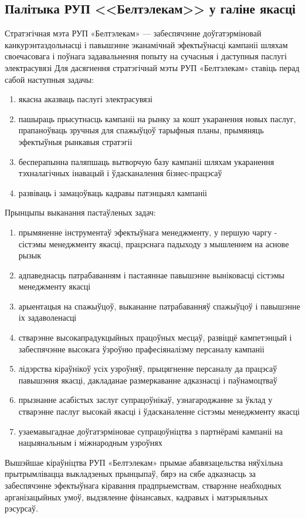 \subsection{Палітыка РУП <<Белтэлекам>> у галіне якасці}
Стратэгічная мэта РУП «Белтэлекам» --- забеспячэнне доўгатэрміновай канкурэнтаздольнасці
і павышэнне эканамічнай эфектыўнасці кампаніі шляхам своечасовага
і поўнага задавальнення попыту на сучасныя і даступныя паслугі электрасувязі
Для дасягнення стратэгічнай мэты РУП «Белтэлекам» ставіць перад сабой наступныя задачы:
\begin{enumerate}
    \item якасна аказваць паслугі электрасувязі
    \item пашыраць прысутнасць кампаніі на рынку за кошт укаранення новых паслуг, прапаноўваць зручныя для спажыўцоў тарыфныя планы, прымяняць эфектыўныя рынкавыя стратэгіі
    \item бесперапынна паляпшаць вытворчую базу кампаніі шляхам укаранення тэхналагічных інавацый і ўдасканалення бізнес-працэсаў
    \item развіваць і замацоўваць кадравы патэнцыял кампаніі
\end{enumerate}

Прынцыпы выканання пастаўленых задач:
\begin{enumerate}
    \item прымяненне інструментаў эфектыўнага менеджменту, у першую чаргу - сістэмы менеджменту якасці, працэснага падыходу з мышленнем на аснове рызык
    \item адпаведнасць патрабаванням і пастаяннае павышэнне выніковасці сістэмы менеджменту якасці
    \item арыентацыя на спажыўцоў, выкананне патрабаванняў спажыўцоў і павышэнне іх задаволенасці
    \item стварэнне высокапрадукцыйных працоўных месцаў, развіццё кампетэнцый і забеспячэнне высокага ўзроўню прафесіяналізму персаналу кампаніі
    \item лідэрства кіраўнікоў усіх узроўняў, прыцягненне персаналу да працэсаў павышэння якасці, дакладанае размеркаванне адказнасці і паўнамоцтваў
    \item прызнанне асабістых заслуг супрацоўнікаў, узнагароджанне за ўклад у стварэнне паслуг высокай якасці і ўдасканаленне сістэмы менеджменту якасці
    \item узаемавыгаднае доўгатэрміновае супрацоўніцтва з партнёрамі кампаніі на нацыянальным і міжнародным узроўнях
\end{enumerate}

Вышэйшае кіраўніцтва РУП «Белтэлекам» прымае абавязацельства няўхільна прытрымлівацца выкладзеных прынцыпаў, бярэ на сябе адказнасць за забеспячэнне эфектыўнага кіравання прадпрыемствам, стварэнне неабходных арганізацыйных умоў, выдзяленне фінансавых, кадравых і матэрыяльных рэсурсаў.
